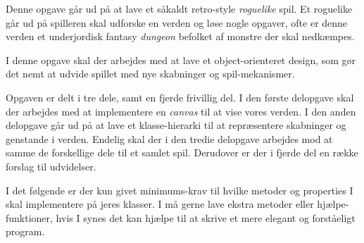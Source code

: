 
Denne opgave går ud på at lave et såkaldt retro-style \emph{roguelike}
spil. Et roguelike går ud på spilleren skal udforske en verden og løse
nogle opgaver, ofte er denne verden et underjordisk fantasy
\emph{dungeon} befolket af monstre der skal nedkæmpes.

I denne opgave skal der arbejdes med at lave et object-orienteret
design, som gør det nemt at udvide spillet med nye skabninger og
spil-mekanismer.

Opgaven er delt i tre dele, samt en fjerde frivillig del. I den første
delopgave skal der arbejdes med at implementere en \emph{canvas} til
at vise vores verden. I den anden delopgave går ud på at lave et
klasse-hierarki til at repræsentere skabninger og genstande i
verden. Endelig skal der i den tredie delopgave arbejdes mod at samme
de forskellige dele til et samlet spil. Derudover er der i fjerde del
en række forslag til udvidelser.

I det følgende er der kun givet minimums-krav til hvilke metoder og
properties I skal implementere på jeres klasser. I må gerne lave
ekstra metoder eller hjælpe-funktioner, hvis I synes det kan hjælpe
til at skrive et mere elegant og forståeligt program.

